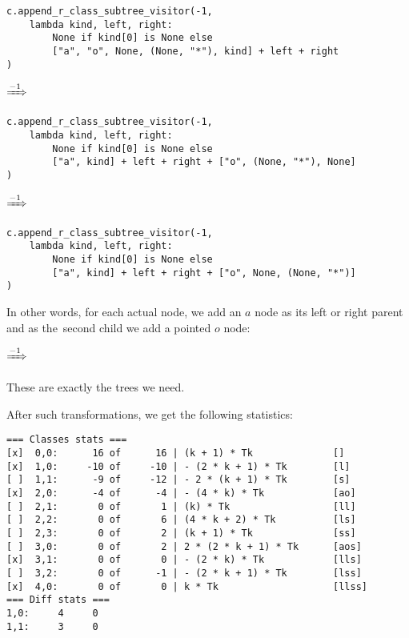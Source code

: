 \documentclass[final]{article}
\theoremstyle{definition}
\theoremstyle{definition}
\theoremstyle{remark}
\newcommand{\includeinlinesvg}[2]{\begin{minipage}{#1\textwidth}\end{minipage}}
\newcommand{\includeinlinescaledsvg}[3]{\begin{minipage}{#1\textwidth}\begin{center}\end{center}\end{minipage}}
\begin{document}
\begin{lstlisting}
c.append_r_class_subtree_visitor(-1,
    lambda kind, left, right:
        None if kind[0] is None else
        ["a", "o", None, (None, "*"), kind] + left + right
)
\end{lstlisting}

\begin{center}
    \includeinlinescaledsvg{.4}{.7}{lambda__transformations__010a}%
    \(\xRightarrow{-1}\)%
    \includeinlinescaledsvg{.4}{.7}{lambda__transformations__010b}%
\end{center}

\begin{lstlisting}
c.append_r_class_subtree_visitor(-1,
    lambda kind, left, right:
        None if kind[0] is None else
        ["a", kind] + left + right + ["o", (None, "*"), None]
)
\end{lstlisting}

\begin{center}
    \includeinlinescaledsvg{.4}{.7}{lambda__transformations__011a}%
    \(\xRightarrow{-1}\)%
    \includeinlinescaledsvg{.4}{.7}{lambda__transformations__011b}%
\end{center}

\begin{lstlisting}
c.append_r_class_subtree_visitor(-1,
    lambda kind, left, right:
        None if kind[0] is None else
        ["a", kind] + left + right + ["o", None, (None, "*")]
)
\end{lstlisting}

In other words, for each actual node, we add an \(a\) node as its left or right parent and as the~second child we add a pointed \(o\) node:

\includeinlinesvg{.20}{lambda__trees_200__0_base}%
\(\xRightarrow{-1}\)%
\includeinlinesvg{.20}{lambda__trees_200__0}%
\includeinlinesvg{.20}{lambda__trees_201__0}%
\includeinlinesvg{.20}{lambda__trees_202__0}%
\includeinlinesvg{.20}{lambda__trees_203__0}%

These are exactly the trees we need.

After such transformations, we get the following statistics:

\begin{lstlisting}
=== Classes stats ===
[x]  0,0:      16 of      16 | (k + 1) * Tk              []
[x]  1,0:     -10 of     -10 | - (2 * k + 1) * Tk        [l]
[ ]  1,1:      -9 of     -12 | - 2 * (k + 1) * Tk        [s]
[x]  2,0:      -4 of      -4 | - (4 * k) * Tk            [ao]
[ ]  2,1:       0 of       1 | (k) * Tk                  [ll]
[ ]  2,2:       0 of       6 | (4 * k + 2) * Tk          [ls]
[ ]  2,3:       0 of       2 | (k + 1) * Tk              [ss]
[ ]  3,0:       0 of       2 | 2 * (2 * k + 1) * Tk      [aos]
[x]  3,1:       0 of       0 | - (2 * k) * Tk            [lls]
[ ]  3,2:       0 of      -1 | - (2 * k + 1) * Tk        [lss]
[x]  4,0:       0 of       0 | k * Tk                    [llss]
=== Diff stats ===
1,0:     4     0
1,1:     3     0
\end{lstlisting}
\end{document}
